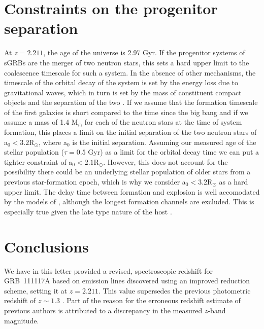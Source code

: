 \documentclass{aa}    %
\begin{document}
\section{Constraints on the progenitor separation}

At $z = 2.211$, the age of the universe is 2.97 Gyr. If the progenitor systems of sGRBs are the merger of two neutron stars, this sets a hard upper limit to the coalescence timescale for such a system. In the absence of other mechanisms, the timescale of the orbital decay of the system is set by the energy loss due to gravitational waves, which in turn is set by the mass of constituent compact objects and the separation of the two \citep{Postnov2014}. If we assume that the formation timescale of the first galaxies is short compared to the time since the big bang \citep{Richard2011} and if we assume a mass of 1.4 M$_\odot$ for each of the neutron stars at the time of system formation, this places a limit on the initial separation of the two neutron stars of a$_0 < 3.2 $R$_\odot$, where a$_0$ is the initial separation. 
Assuming our measured age of the stellar population ($\tau = 0.5$ Gyr) as a limit for the orbital decay time we can put a tighter constraint of a$_0 < 2.1 $R$_\odot$. However, this does not account for the possibility there could be an underlying stellar population of older stars from a previous star-formation epoch, which is why we consider a$_0 < 3.2 $R$_\odot$ as a hard upper limit. The delay time between formation and explosion is well accomodated by the models of \citet{Belczynski2006}, although the longest formation channels are excluded. This is especially true given the late type nature of the host \citep{OShaughnessy2008}.

\section{Conclusions}

We have in this letter provided a revised, spectroscopic redshift for GRB~111117A based on emission lines discovered using an improved reduction scheme, setting it at $z = 2.211$. This value supersedes the previous photometric redshift of $z \sim 1.3$ \citep{Margutti2012, Sakamoto2013}. Part of the reason for the erroneous redshift estimate of previous authors is attributed to a discrepancy in the measured $z$-band magnitude. 
\end{document}
